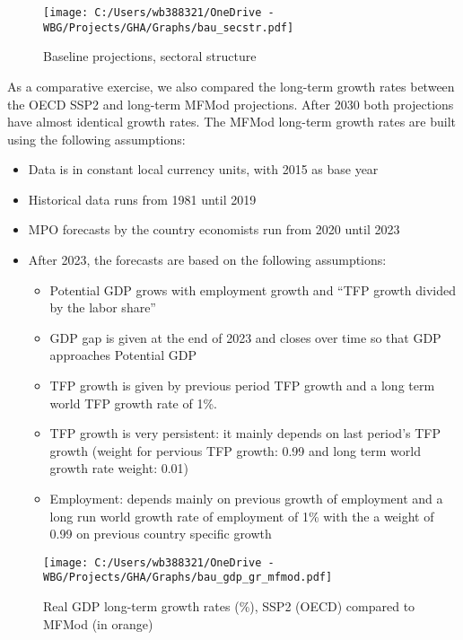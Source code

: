 \documentclass[11pt,english]{article}
\begin{document}
\begin{figure}[ht!]\caption{Baseline projections, sectoral structure} \label{fig_bau_secstr}
	\centering
	\texttt{[image: C:/Users/wb388321/OneDrive - WBG/Projects/GHA/Graphs/bau\_secstr.pdf]}
\end{figure}
As a comparative exercise, we also compared the long-term growth rates between the OECD SSP2 and long-term MFMod projections. After 2030 both projections have almost identical growth rates. The MFMod long-term growth rates are built using the following assumptions:
\begin{itemize}
	\item Data is in constant local currency units, with 2015 as base year
	\item Historical data runs from 1981 until 2019
	\item	MPO forecasts by the country economists run from 2020 until 2023
	\item After 2023, the forecasts are based on the following assumptions:
	\begin{itemize}
		\item Potential GDP grows with employment growth and ``TFP growth divided by the labor share''
		\item GDP gap is given at the end of 2023 and closes over time so that GDP approaches Potential GDP
		\item TFP growth is given by previous period TFP growth and a long term world TFP growth rate of 1\%. 
		\item TFP growth is very persistent: it mainly depends on last period's TFP growth (weight for pervious TFP growth: 0.99 and long term world growth rate weight: 0.01)
		\item Employment: depends mainly on previous growth of employment and a long run world growth rate of employment of 1\% with the a weight of 0.99 on previous country specific growth
	\end{itemize}
\end{itemize}

\begin{figure}[ht!]\caption{Real GDP long-term growth rates (\%),  SSP2 (OECD) compared to MFMod (in orange)} \label{fig_bau_gdp_gr_mfmod}
	\centering
	\texttt{[image: C:/Users/wb388321/OneDrive - WBG/Projects/GHA/Graphs/bau\_gdp\_gr\_mfmod.pdf]}
\end{figure}
\end{document}
